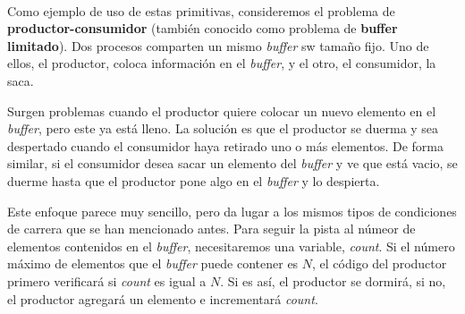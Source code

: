 \documentclass{article}
\begin{document}
\\
Como ejemplo de uso de estas primitivas, consideremos el problema de 
{\bf productor-consumidor} (tambi\'en conocido como problema de 
{\bf buffer limitado}). Dos procesos comparten un mismo {\it buffer} 
sw tama\~no fijo. Uno de ellos, el productor, coloca informaci\'on en 
el {\it buffer}, y el otro, el consumidor, la saca.

Surgen problemas cuando el productor quiere colocar un nuevo elemento 
en el {\it buffer}, pero este ya est\'a lleno. La soluci\'on es que el 
productor se duerma y sea despertado cuando el consumidor haya 
retirado uno o m\'as elementos. De forma similar, si el consumidor 
desea sacar un elemento del {\it buffer} y ve que est\'a vacio, se 
duerme hasta que el productor pone algo en el {\it buffer} y lo despierta.

Este enfoque parece muy sencillo, pero da lugar a los mismos tipos de 
condiciones de carrera que se han mencionado antes. Para seguir la pista 
al n\'umeor de elementos contenidos en el {\it buffer}, necesitaremos una 
variable, {\it count}. Si el n\'umero m\'aximo de elementos que el 
{\it buffer} puede contener es $N$, el c\'odigo del productor primero 
verificar\'a si {\it count} es igual a $N$. Si es as\'i, el productor 
se dormir\'a, si no, el productor agregar\'a un elemento e incrementar\'a 
{\it count}.
\end{document}

